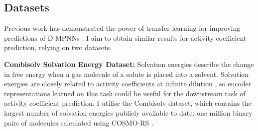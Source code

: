 




\subsection{Datasets}

Previous work has demonstrated the power of transfer learning for improving predictions of D-MPNNs \cite{Vermeire2021}. I aim to obtain similar results for activity coefficient prediction, relying on two datasets.

\noindent
\textbf{Combisolv Solvation Energy Dataset:} Solvation energies describe the change in free energy when a gas molecule of a solute is placed into a solvent. Solvation energies are closely related to activity coefficients at infinite dilution \cite{Moine2017}, so encoder representations learned on this task could be useful for the downstream task of activity coefficient prediction. I utilise the Combisolv dataset, which contains the largest number of solvation energies publicly available to date: one million binary pairs of molecules calculated using COSMO-RS \cite{Vermeire2021}.

